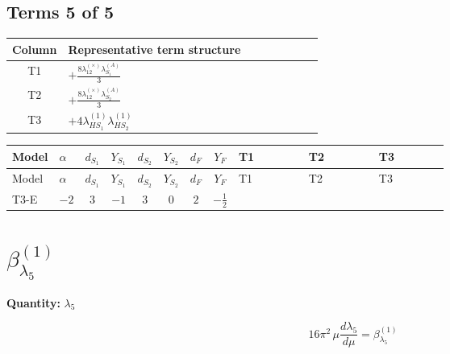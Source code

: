 \documentclass[8pt]{article}
\begin{document}
\begin{landscape}
\subsection*{Terms 5 of 5}
\begin{center}
\begin{tabular}{@{}c >{\raggedright\arraybackslash}p{0.82\linewidth}@{}}
\toprule
Column & Representative term structure \\
\midrule
T1 & \(\displaystyle +\frac{8 {\lambda_{12}^{(\times)}} {\lambda_{S_1}^{(A)}}}{3}\) \\
\midrule
T2 & \(\displaystyle +\frac{8 {\lambda_{12}^{(\times)}} {\lambda_{S_2}^{(A)}}}{3}\) \\
\midrule
T3 & \(\displaystyle +4 {\lambda_{HS_1}^{(1)}} {\lambda_{HS_2}^{(1)}}\) \\
\midrule
\bottomrule
\end{tabular}
\end{center}
\smallskip
\tiny
\begin{longtable}{@{}llcccccc >{\raggedright\arraybackslash}p{0.21\linewidth} >{\raggedright\arraybackslash}p{0.21\linewidth} >{\raggedright\arraybackslash}p{0.21\linewidth}@{}}
\toprule
Model & $\alpha$ & $d_{S_1}$ & $Y_{S_1}$ & $d_{S_2}$ & $Y_{S_2}$ & $d_F$ & $Y_F$ & T1 & T2 & T3 \\
\midrule
\endfirsthead
\toprule
Model & $\alpha$ & $d_{S_1}$ & $Y_{S_1}$ & $d_{S_2}$ & $Y_{S_2}$ & $d_F$ & $Y_F$ & T1 & T2 & T3 \\
\midrule
\endhead
T3-E & $-2$ & $3$ & $-1$ & $3$ & $0$ & $2$ & $-\frac{1}{2}$ & \scriptsize\adjustbox{max width=\linewidth}{$\begin{gathered} +\frac{8 {\lambda_{12}^{(\times)}} {\lambda_{S_1}^{(A)}}}{3}\end{gathered}$} & \scriptsize\adjustbox{max width=\linewidth}{$\begin{gathered} +\frac{8 {\lambda_{12}^{(\times)}} {\lambda_{S_2}^{(A)}}}{3}\end{gathered}$} & \scriptsize\adjustbox{max width=\linewidth}{$\begin{gathered} +4 {\lambda_{HS_1}^{(1)}} {\lambda_{HS_2}^{(1)}}\end{gathered}$} \\
\midrule
\bottomrule
\end{longtable}
\clearpage
\section*{$\beta_{\lambda_5}^{(1)}$}
\noindent\textbf{Quantity: }$\lambda_5$\par\smallskip
\[16\pi^2\,\mu\frac{d \lambda_5}{d\mu}=\beta_{\lambda_5}^{(1)}\]

\end{landscape}
\end{document}
